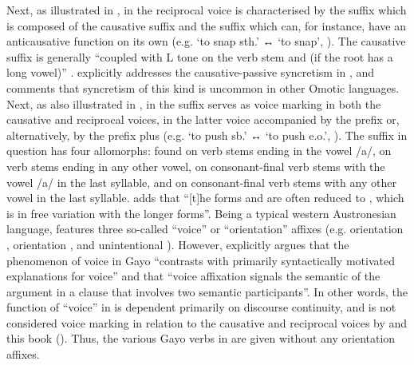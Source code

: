 Next, as illustrated in , in  the reciprocal voice is characterised by the suffix  which is composed of the causative suffix  and the suffix  which can, for instance, have an anticausative function on its own (e.g.  ‘to snap sth.’ ↔  ‘to snap’, \citealt[284]{hellenthal:2010}). The causative suffix is generally “coupled with L tone on the verb stem and  (if the root has a long vowel)” \citep[373]{hellenthal:2010}. \citet[395]{hellenthal:2010} explicitly addresses the causative-passive syncretism in , and comments that syncretism of this kind is uncommon in other Omotic languages. Next, as also illustrated in , in  the suffix  serves as voice marking in both the causative and reciprocal voices, in the latter voice accompanied by the prefix  or, alternatively, by the prefix  plus  (e.g.  ‘to push sb.’ ↔  ‘to push e.o.’, \citealt[154]{eades:2005}). The suffix in question has four allomorphs:  found on verb stems ending in the vowel /a/,  on verb stems ending in any other vowel,  on consonant-final verb stems with the vowel /a/ in the last syllable, and  on consonant-final verb stems with any other vowel in the last syllable. \citet[39f.]{eades:2005} adds that “[t]he forms  and  are often reduced to , which is in free variation with the longer forms”. Being a typical western Austronesian language,  features three so-called “voice” or “orientation” affixes (e.g.  orientation ,  orientation , and unintentional  ). However, \citet[167]{eades:2005} explicitly argues that the phenomenon of voice in Gayo “contrasts with primarily syntactically motivated explanations for voice” and that “voice affixation signals the semantic  of the  argument in a clause that involves two semantic participants”. In other words, the function of “voice” in  is dependent primarily on discourse continuity, and is not considered voice marking in relation to the causative and reciprocal voices by \citet[162f., 186ff.]{eades:2005} and this book (). Thus, the various Gayo verbs in  are given without any orientation affixes. 

